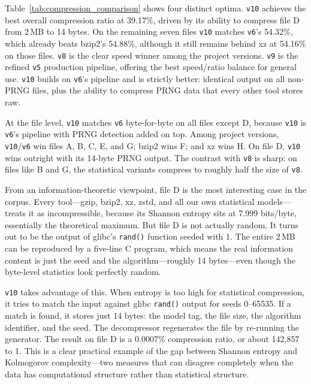 Table~\ref{tab:compression_comparison} shows four distinct optima. \texttt{v10} achieves the best overall compression ratio at 39.17\%, driven by its ability to compress file D from 2\,MB to 14 bytes. On the remaining seven files \texttt{v10} matches \texttt{v6}'s 54.32\%, which already beats bzip2's 54.88\%, although it still remains behind xz at 54.16\% on those files. \texttt{v8} is the clear speed winner among the project versions. \texttt{v9} is the refined \texttt{v5} production pipeline, offering the best speed/ratio balance for general use. \texttt{v10} builds on \texttt{v6}'s pipeline and is strictly better: identical output on all non-PRNG files, plus the ability to compress PRNG data that every other tool stores raw.

At the file level, \texttt{v10} matches \texttt{v6} byte-for-byte on all files except D, because \texttt{v10} is \texttt{v6}'s pipeline with PRNG detection added on top. Among project versions, \texttt{v10}/\texttt{v6} win files A, B, C, E, and G; bzip2 wins F; and xz wins H. On file D, \texttt{v10} wins outright with its 14-byte PRNG output. The contrast with \texttt{v8} is sharp: on files like B and G, the statistical variants compress to roughly half the size of \texttt{v8}.

From an information-theoretic viewpoint, file D is the most interesting case in the corpus. Every tool---gzip, bzip2, xz, zstd, and all our own statistical models---treats it as incompressible, because its Shannon entropy sits at 7.999 bits/byte, essentially the theoretical maximum. But file D is not actually random. It turns out to be the output of glibc's \texttt{rand()} function seeded with 1. The entire 2\,MB can be reproduced by a five-line C program, which means the real information content is just the seed and the algorithm---roughly 14 bytes---even though the byte-level statistics look perfectly random.

\texttt{v10} takes advantage of this. When entropy is too high for statistical compression, it tries to match the input against glibc \texttt{rand()} output for seeds 0--65535. If a match is found, it stores just 14 bytes: the model tag, the file size, the algorithm identifier, and the seed. The decompressor regenerates the file by re-running the generator. The result on file D is a 0.0007\% compression ratio, or about 142,857 to 1. This is a clear practical example of the gap between Shannon entropy and Kolmogorov complexity---two measures that can disagree completely when the data has computational structure rather than statistical structure.

